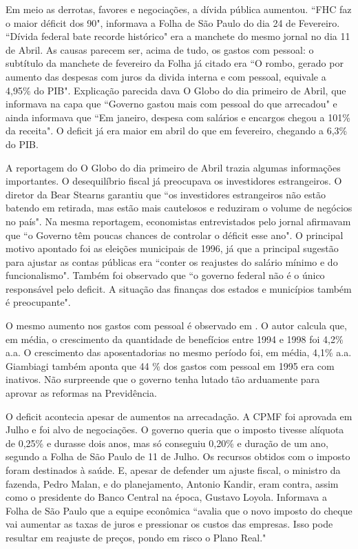 \documentclass{article}
\begin{document}
Em meio as derrotas, favores e negociações, a dívida pública aumentou. ``FHC faz o maior déficit dos 90", informava a Folha de São Paulo do dia 24 de Fevereiro. ``Dívida federal bate recorde histórico" era a manchete do mesmo jornal no dia 11 de Abril. As causas parecem ser, acima de tudo, os gastos com pessoal: o subtítulo da manchete de fevereiro da Folha já citado era ``O rombo, gerado por aumento das despesas com juros da divida interna e com pessoal, equivale a 4,95\% do PIB". Explicação parecida dava O Globo do dia primeiro de Abril, que informava na capa que ``Governo gastou mais com pessoal do que arrecadou" e ainda informava que ``Em janeiro, despesa com salários e encargos chegou a 101\% da receita". O deficit já era maior em abril do que em fevereiro, chegando a 6,3\% do PIB.

A reportagem do O Globo do dia primeiro de Abril trazia algumas informações importantes. O desequilíbrio fiscal já preocupava os investidores estrangeiros. O diretor da Bear Stearns garantiu que ``os investidores estrangeiros não estão batendo em retirada, mas estão mais cautelosos e reduziram o volume de negócios no país". Na mesma reportagem, economistas entrevistados pelo jornal afirmavam que ``o Governo têm poucas chances de controlar o déficit esse ano". O principal motivo apontado foi as eleições municipais de 1996, já que a principal sugestão para ajustar as contas públicas era ``conter os reajustes do salário mínimo e do funcionalismo". Também foi observado que ``o governo federal não é o único responsável pelo deficit. A situação das finanças dos estados e municípios também é preocupante".  

O mesmo aumento nos gastos com pessoal é observado em \citet{Giambiagi2002}. O autor calcula que, em média, o crescimento da quantidade de benefícios entre 1994 e 1998 foi 4,2\% a.a. O crescimento das aposentadorias no mesmo período foi, em média, 4,1\% a.a. Giambiagi também aponta que 44 \% dos gastos com pessoal em 1995 era com inativos. Não surpreende que o governo tenha lutado tão arduamente para aprovar as reformas na Previdência.   

O deficit acontecia apesar de aumentos na arrecadação. A CPMF foi aprovada em Julho e foi alvo de negociações. O governo queria que o imposto tivesse alíquota de 0,25\% e durasse dois anos, mas só conseguiu 0,20\% e duração de um ano, segundo a Folha de São Paulo de 11 de Julho. Os recursos obtidos com o imposto foram destinados à saúde. E, apesar de defender um ajuste fiscal, o ministro da fazenda, Pedro Malan, e do planejamento, Antonio Kandir, eram contra, assim como o presidente do Banco Central na época, Gustavo Loyola. Informava a Folha de São Paulo que a equipe econômica ``avalia que o novo imposto do cheque vai aumentar as taxas de juros e pressionar os custos das empresas. Isso pode resultar em reajuste de preços, pondo em risco o Plano Real."
\end{document}
